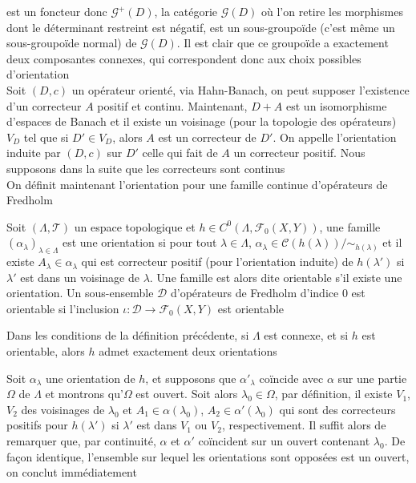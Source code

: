 \documentclass[memoire.tex]{subfiles}
\begin{document}
est un foncteur donc $\mathcal{G}^+(D)$, la catégorie $\mathcal{G}(D)$ où l'on retire les morphismes dont le déterminant restreint est négatif, est un sous-groupoïde (c'est même un sous-groupoïde normal) de $\mathcal{G}(D)$. Il est clair que ce groupoïde a exactement deux composantes connexes, qui correspondent donc aux choix possibles d'orientation\\
Soit $(D,c)$ un opérateur orienté, via Hahn-Banach, on peut supposer l'existence d'un correcteur $A$ positif et continu. Maintenant, $D+A$ est un isomorphisme d'espaces de Banach et il existe un voisinage (pour la topologie des opérateurs) $V_D$ tel que si $D'\in V_D$, alors $A$ est un correcteur de $D'$. On appelle \textcolor{color-def}{l'orientation induite par $(D,c)$} sur $D'$ celle qui fait de $A$ un correcteur positif. Nous supposons dans la suite que les correcteurs sont continus\\
On définit maintenant l'orientation pour une famille continue d'opérateurs de Fredholm
\begin{definition}
    Soit $(\Lambda,\mathcal{T})$ un espace topologique et $h\in C^0(\Lambda,\mathcal{F}_0(X,Y))$,
    une famille $(\alpha_{\lambda})_{\lambda\in\Lambda}$
    est une 
     \textcolor{color-def}{orientation} 
    si  pour tout $\lambda\in\Lambda$, $\alpha_{\lambda}\in\mathcal{C}(h(\lambda))/\sim_{h(\lambda)}$ et il existe $A_{\lambda}\in\alpha_\lambda$ qui est correcteur positif (pour l'orientation induite) de $h(\lambda')$ si $\lambda'$ est dans un voisinage de $\lambda$. Une famille est alors dite \textcolor{color-def}{orientable} s'il existe une orientation. Un sous-ensemble $\mathcal{D}$ d'opérateurs de Fredholm d'indice 0 est orientable si l'inclusion $\iota : \mathcal{D}\rightarrow \mathcal{F}_0(X,Y)$ est orientable
\end{definition}

\begin{lemme}
    Dans les conditions de la définition précédente, si $\Lambda$ est connexe, et si $h$ est orientable, alors $h$ admet exactement deux orientations 
\end{lemme}

\begin{preuve}
    Soit $\alpha_\lambda$ une orientation de $h$, et supposons que $\alpha'_\lambda$ coïncide avec $\alpha$ sur une partie $\Omega$ de $\Lambda$ et montrons qu'$\Omega$ est ouvert. Soit alors $\lambda_0\in\Omega$, par définition, il existe $V_1$,$V_2$ des voisinages de $\lambda_0$  et $A_1\in\alpha(\lambda_0)$, 
    $A_2\in\alpha'(\lambda_0)$ qui sont des correcteurs positifs pour $h(\lambda')$ si $\lambda'$ est dans $V_1$ ou $V_2$, respectivement. Il suffit alors de remarquer que, par continuité, $\alpha$ et $\alpha'$ coïncident sur un ouvert contenant $\lambda_0$. De façon identique, l'ensemble sur lequel les orientations sont opposées est un ouvert, on conclut immédiatement
\end{preuve}
\end{document}
